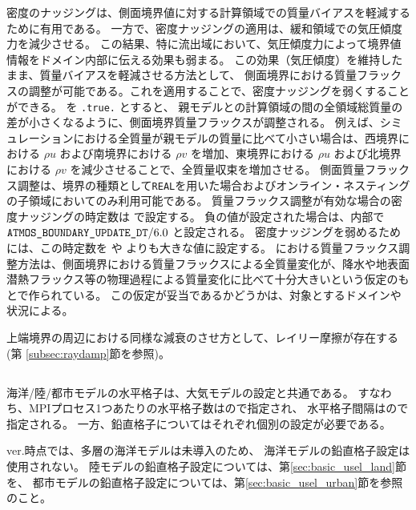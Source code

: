 密度のナッジングは、側面境界値に対する計算領域での質量バイアスを軽減するために有用である。
一方で、密度ナッジングの適用は、緩和領域での気圧傾度力を減少させる。
この結果、特に流出域において、気圧傾度力によって境界値情報をドメイン内部に伝える効果も弱まる。
この効果（気圧傾度）を維持したまま、質量バイアスを軽減させる方法として、
側面境界における質量フラックスの調整が可能である。これを適用することで、密度ナッジングを弱くすることができる。
%
 を \verb|.true.| とすると、
親モデルと\scale の計算領域の間の全領域総質量の差が小さくなるように、側面境界質量フラックスが調整される。
例えば、シミュレーションにおける全質量が親モデルの質量に比べて小さい場合は、西境界における $\rho u$ および南境界における $\rho v$ を増加、東境界における $\rho u$ および北境界における $\rho v$ を減少させることで、全質量収束を増加させる。
側面質量フラックス調整は、境界の種類として\verb|REAL|を用いた場合およびオンライン・ネスティングの子領域においてのみ利用可能である。
質量フラックス調整が有効な場合の密度ナッジングの時定数は  で設定する。
負の値が設定された場合は、内部で $\nmitemeq{ATMOS_BOUNDARY_UPDATE_DT} / 6.0$ と設定される。
密度ナッジングを弱めるためには、この時定数を  や  よりも大きな値に設定する。
\scalerm における質量フラックス調整方法は、側面境界における質量フラックスによる全質量変化が、降水や地表面潜熱フラックス等の物理過程による質量変化に比べて十分大きいという仮定のもとで作られている。
この仮定が妥当であるかどうかは、対象とするドメインや状況による。


上端境界の周辺における同様な減衰のさせ方として、レイリー摩擦が存在する(第 \ref{subsec:raydamp}節を参照)。

\subsection{\SubsecGridOceanLandUrban} \label{subsec:gridolu}

海洋/陸/都市モデルの水平格子は、大気モデルの設定と共通である。
すなわち、MPIプロセス1つあたりの水平格子数はので指定され、
水平格子間隔はので指定される。
一方、鉛直格子についてはそれぞれ個別の設定が必要である。

\scale ver.\version 時点では、多層の海洋モデルは未導入のため、
海洋モデルの鉛直格子設定は使用されない。%
陸モデルの鉛直格子設定については、第\ref{sec:basic_usel_land}節を、
都市モデルの鉛直格子設定については、第\ref{sec:basic_usel_urban}節を参照のこと。

